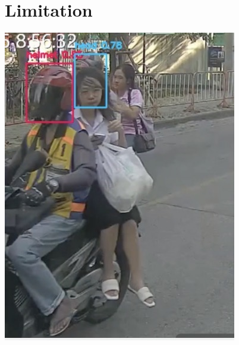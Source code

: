 \section{Limitation}

\begin{center}
	\begin{minipage}{0.45\textwidth}
		\centering
		\includegraphics[width=\linewidth]{limitation2.png}
		\vspace{0.5em} %
		

\end{minipage}
\end{center}
